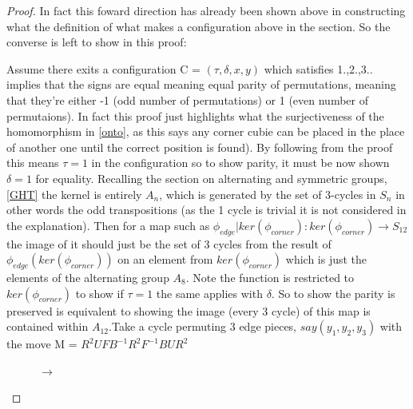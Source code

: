 \documentclass{article}
\begin{document}
\begin{proof}
In fact this foward direction has already been shown above in constructing what the definition of what makes a configuration above in the section. So the converse is left to show in this proof:

Assume there exits a configuration C = $(\tau,\delta, x, y)$  which satisfies 1.,2.,3.. implies that the signs are equal meaning equal parity of permutations, meaning that they're either -1 (odd number of permutations) or 1 (even number of permutaions).
In fact this proof just highlights what the surjectiveness of the homomorphism in \ref{onto}, as this says any corner cubie can be placed in the place of another one until the correct position is found). %
By following from the proof this means $\tau=1$ in the configuration so to show parity, it must be now shown $\delta=1$ for equality. Recalling the section on alternating and symmetric groups,\ref{GHT} the kernel is entirely $A_{n}$, which is generated by the set of 3-cycles in $S_{n}$ in other words the odd transpositions (as the 1 cycle is trivial it is not considered in the explanation). Then for a map such as $\phi_{edge} | ker(\phi_{corner}): ker(\phi_{corner}) \rightarrow S_{12}$ the image of it should just be the set of 3 cycles from the result of $\phi_{edge}(ker(\phi_{corner}))$ on an element from $ker(\phi_{corner})$ which is just the elements of the alternating group $A_{8}$. Note the function is restricted to $ker(\phi_{corner})$ to show if $\tau=1$ the same applies with $\delta$. So to show the parity is preserved is equivalent to showing the image (every 3 cycle) of this map is contained within $A_{12}$.\newline Take a cycle permuting 3 edge pieces, $say (y_1,y_2,y_3)$ with the move M = $R^{2}UFB^{-1}R^{2}F^{-1}BUR^{2}$

\newcommand{\threecycle}{[Edge 3 Cycle], R2,U,F,Bp,R2,Fp,B,U,R2}
\newcommand{\CubeUpSideDown}{\RubikCubeSolved\RubikRotation{x2,y}}
\begin{figure}[h]
\RubikCubeSolvedWY%
%
\quad{}%
\RubikRotation{\threecycle}%
\quad\SequenceBraceA{\SequenceName}{\ShowSequence{}{\Rubik}{\SequenceLong}}
\quad$\longrightarrow$\quad
{}%
\end{figure}


\end{proof}
\end{document}
